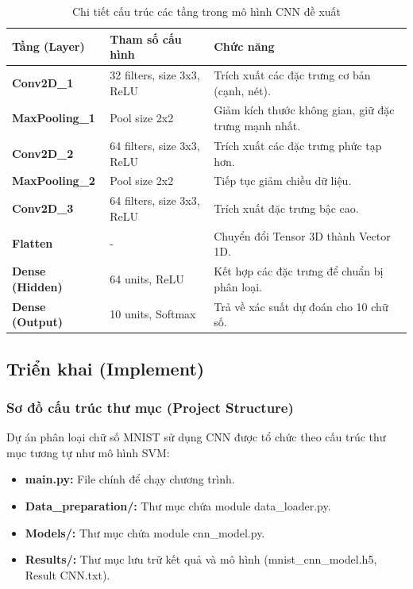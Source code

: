 \documentclass[../DoAn.tex]{subfiles}
\begin{document}
\begin{table}[H]
\centering
\small
\caption{Chi tiết cấu trúc các tầng trong mô hình CNN đề xuất}
\begin{tabularx}{\textwidth}{|l|l|X|}
\hline
\textbf{Tầng (Layer)} & \textbf{Tham số cấu hình} & \textbf{Chức năng} \\ \hline
\textbf{Conv2D\_1} & 32 filters, size 3x3, ReLU & Trích xuất các đặc trưng cơ bản (cạnh, nét). \\ \hline
\textbf{MaxPooling\_1} & Pool size 2x2 & Giảm kích thước không gian, giữ đặc trưng mạnh nhất. \\ \hline
\textbf{Conv2D\_2} & 64 filters, size 3x3, ReLU & Trích xuất các đặc trưng phức tạp hơn. \\ \hline
\textbf{MaxPooling\_2} & Pool size 2x2 & Tiếp tục giảm chiều dữ liệu. \\ \hline
\textbf{Conv2D\_3} & 64 filters, size 3x3, ReLU & Trích xuất đặc trưng bậc cao. \\ \hline
\textbf{Flatten} & \centering - & Chuyển đổi Tensor 3D thành Vector 1D. \\ \hline
\textbf{Dense (Hidden)} & 64 units, ReLU & Kết hợp các đặc trưng để chuẩn bị phân loại. \\ \hline
\textbf{Dense (Output)} & 10 units, Softmax & Trả về xác suất dự đoán cho 10 chữ số. \\ \hline
\end{tabularx}
\end{table}

\subsection{Triển khai (Implement)}

\subsubsection{Sơ đồ cấu trúc thư mục (Project Structure)}

Dự án phân loại chữ số MNIST sử dụng CNN được tổ chức theo cấu trúc thư mục tương tự như mô hình SVM:

\begin{itemize}
    \item \textbf{main.py:} File chính để chạy chương trình.
    \item \textbf{Data\_preparation/:} Thư mục chứa module data\_loader.py.
    \item \textbf{Models/:} Thư mục chứa module cnn\_model.py.
    \item \textbf{Results/:} Thư mục lưu trữ kết quả và mô hình (mnist\_cnn\_model.h5, Result CNN.txt).\\
\end{itemize}
\end{document}

